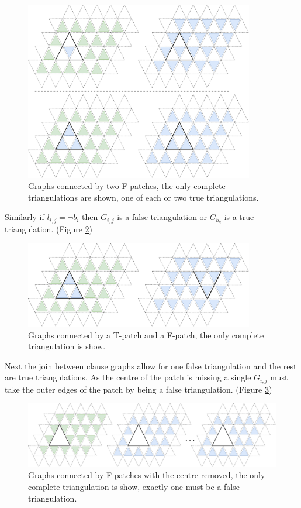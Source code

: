 \documentclass[a4paper,11pt]{report}
\begin{document}
\begin{figure}[h!]
\begin{center}
		\includegraphics[width=100mm]{figures/first_holyer_lemma.png}
\end{center}
		\caption{Graphs connected by two F-patches, the only complete triangulations are shown, one of each or two true triangulations.}
\label{holyerone}
\end{figure}


Similarly if  $l_{i,j}=\neg b_i$ then $G_{i,j}$ is a false triangulation or $G_{b_k}$ is a true triangulation. (Figure \ref{holyertwo})

\begin{figure}[h!]
\begin{center}
		\includegraphics[width=100mm]{figures/lemma_two_holyer.png}
\end{center}
		\caption{Graphs connected by a T-patch and a F-patch, the only complete triangulation is show.}
\label{holyertwo}
\end{figure}

Next the join between clause graphs allow for one false triangulation and the rest are true triangulations. As the centre of the patch is missing a single $G_{i,j}$ must take the outer edges of the patch by being a false triangulation. (Figure \ref{holyerthree})

\begin{figure}[h!]
\begin{center}
		\includegraphics[width=120mm]{figures/lemma_three_holyer.png}
\end{center}
		\caption{Graphs connected by F-patches with the centre removed, the only complete triangulation is show, exactly one must be a false triangulation.}
\label{holyerthree}
\end{figure}
\end{document}
